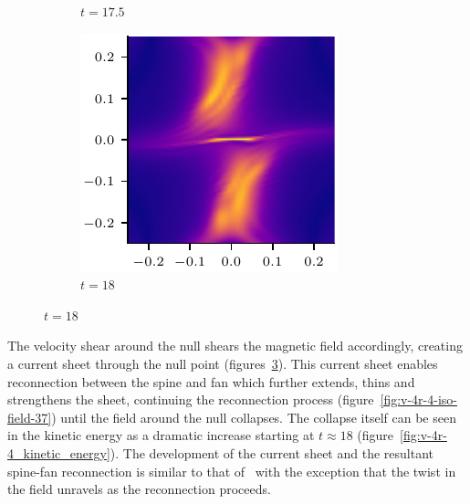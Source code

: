\begin{figure}[t]
\begin{subfigure}{0.32\textwidth}
      \caption{$t=17.5$}
      \label{fig:v-4r-4-spine-fan-reconn-35}
    \end{subfigure}
    \hfill
    \begin{subfigure}{0.32\textwidth}
      \includegraphics[width=\linewidth]{v-4r-4-spine-fan-reconn-36.pdf}
      \caption{$t=18$}
      \label{fig:v-4r-4-spine-fan-reconn-36}
    \end{subfigure}
\label{fig:spine_fan_reconnection_current_sheet}
\end{figure}

The velocity shear around the null shears the magnetic field accordingly, creating a current sheet through the null point (figures~\ref{fig:spine_fan_reconnection_current_sheet}). This current sheet enables reconnection between the spine and fan which further extends, thins and strengthens the sheet, continuing the reconnection process (figure~\ref{fig:v-4r-4-iso-field-37}) until the field around the null collapses. The collapse itself can be seen in the kinetic energy as a dramatic increase starting at $t\approx18$ (figure~\ref{fig:v-4r-4_kinetic_energy}). The development of the current sheet and the resultant spine-fan reconnection is similar to that of~\cite{pontinCurrentSheetFormation2007} with the exception that the twist in the field unravels as the reconnection proceeds. 

